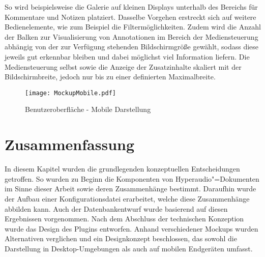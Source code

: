 So wird beispielsweise die Galerie auf kleinen Displays unterhalb des Bereichs für Kommentare und Notizen platziert. Dasselbe Vorgehen erstreckt sich auf weitere Bedienelemente, wie zum Beispiel die Filtermöglichkeiten. Zudem wird die Anzahl der Balken zur Visualisierung von Annotationen im Bereich der Mediensteuerung abhängig von der zur Verfügung stehenden Bildschirmgröße gewählt, sodass diese jeweils gut erkennbar bleiben und dabei möglichst viel Information liefern. Die Mediensteuerung selbst sowie die Anzeige der Zusatzinhalte skaliert mit der Bildschirmbreite, jedoch nur bis zu einer definierten Maximalbreite.

\FloatBarrier

\begin{figure}[h!]
\texttt{[image: MockupMobile.pdf]}
\caption{\label{fig:MockupMobile} Benutzeroberfläche - Mobile Darstellung}
\end{figure}

\section{Zusammenfassung}
In diesem Kapitel wurden die grundlegenden konzeptuellen Entscheidungen getroffen. So wurden zu Beginn die Komponenten von Hyperaudio"=Dokumenten im Sinne dieser Arbeit sowie deren Zusammenhänge bestimmt. Daraufhin wurde der Aufbau einer Konfigurationsdatei erarbeitet, welche diese Zusammenhänge abbilden kann. Auch der Datenbankentwurf wurde basierend auf diesen Ergebnissen vorgenommen. Nach dem Abschluss der technischen Konzeption wurde das Design des Plugins entworfen. Anhand verschiedener Mockups wurden Alternativen verglichen und ein Designkonzept beschlossen, das sowohl die Darstellung in Desktop-Umgebungen als auch auf mobilen Endgeräten umfasst.
